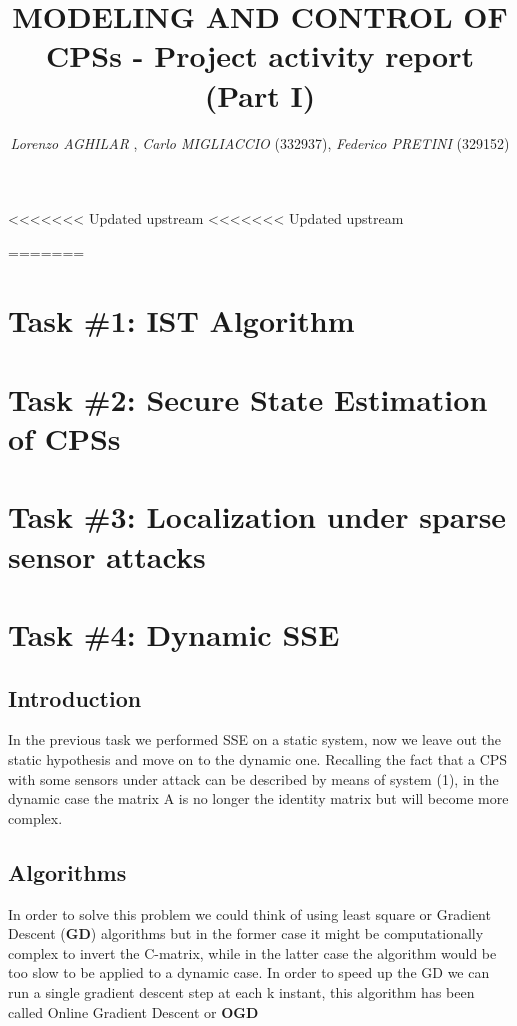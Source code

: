 \documentclass[a4paper,11pt]{article}
\begin{document}
    
    \title{
        \linespread{0.3}
        \vspace{-2.5cm}
        \textbf{
        {\large{MODELING AND CONTROL OF CPSs}  - \Large {Project activity report (Part I)}}\\
        }
        \vspace{-0.5em}
    }
    \author{
        \textit{
            \normalsize 
        Lorenzo AGHILAR} ,
        \textit{Carlo MIGLIACCIO} (332937), 
        \textit{Federico PRETINI} (329152)}
    
    \date{}
    \clearpage\maketitle
    \thispagestyle{empty}
    \vspace{-2em}

<<<<<<< Updated upstream
<<<<<<< Updated upstream
    
=======

    \section*{Task \#1: IST Algorithm}
    

    \section*{Task \#2: Secure State Estimation of CPSs}

    \section*{Task \#3: Localization under sparse sensor attacks}
    \newpage
    \section*{Task \#4: Dynamic SSE}
    \subsection*{Introduction}
    In the previous task we performed SSE on a static system, now we leave out the static hypothesis and move on to the dynamic one.
    Recalling the fact that a CPS with some sensors under attack can be described by means of system (1), in the dynamic case the matrix A is no longer the identity matrix but will become more complex.
    \subsection*{Algorithms}
    In order to solve this problem we could think of using least square or Gradient Descent (\textbf{GD}) algorithms but in the former case it might be computationally complex to invert the C-matrix, while in the latter case the algorithm would be too slow to be applied to a dynamic case.
    In order to speed up the GD we can run a single gradient descent step at each k instant, this algorithm has been called Online Gradient Descent or \textbf{OGD} 
\end{document}
